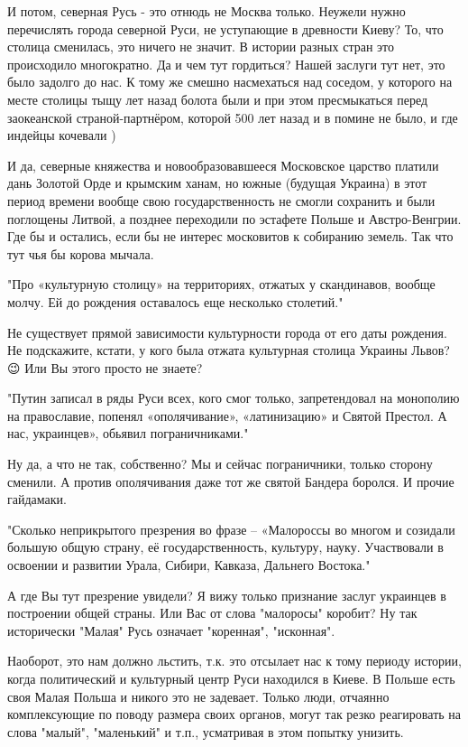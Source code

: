 \begin{itemize}
И потом, северная Русь - это отнюдь не Москва только. Неужели нужно перечислять
города северной Руси, не уступающие в древности Киеву? То, что столица
сменилась, это ничего не значит. В истории разных стран это происходило
многократно. Да и чем тут гордиться? Нашей заслуги тут нет, это было задолго до
нас. К тому же смешно насмехаться над соседом, у которого на месте столицы тыщу
лет назад болота были и при этом пресмыкаться перед заокеанской
страной-партнёром, которой 500 лет назад и в помине не было, и где индейцы
кочевали )

И да, северные княжества и новообразовавшееся Московское царство платили дань
Золотой Орде и крымским ханам, но южные (будущая Украина) в этот период времени
вообще свою государственность не смогли сохранить и были поглощены Литвой, а
позднее переходили по эстафете Польше и Австро-Венгрии. Где бы и остались, если
бы не интерес московитов к собиранию земель. Так что тут чья бы корова мычала.

"Про «культурную столицу» на территориях, отжатых у скандинавов, вообще молчу.
Ей до рождения оставалось еще несколько столетий." 

Не существует прямой зависимости культурности города от его даты рождения. Не
подскажите, кстати, у кого была отжата культурная столица Украины Львов? 😉 Или
Вы этого просто не знаете?

"Путин записал в ряды Руси всех, кого смог только, запретендовал на монополию
на православие, попенял «ополячивание», «латинизацию» и Святой Престол. А нас,
украинцев», обьявил пограничниками." 

Ну да, а что не так, собственно? Мы и сейчас пограничники, только сторону
сменили. А против ополячивания даже тот же святой Бандера боролся. И прочие
гайдамаки.

"Сколько неприкрытого презрения во фразе – «Малороссы во многом и созидали
большую общую страну, её государственность, культуру, науку. Участвовали в
освоении и развитии Урала, Сибири, Кавказа, Дальнего Востока." 

А где Вы тут презрение увидели? Я вижу только признание заслуг украинцев в
построении общей страны. Или Вас от слова "малоросы" коробит? Ну так
исторически "Малая" Русь означает "коренная", "исконная". 

Наоборот, это нам должно льстить, т.к. это отсылает нас к тому периоду истории,
когда политический и культурный центр Руси находился в Киеве. В Польше есть
своя Малая Польша и никого это не задевает. Только люди, отчаянно комплексующие
по поводу размера своих органов, могут так резко реагировать на слова "малый",
"маленький" и т.п., усматривая в этом попытку унизить.


\end{itemize}

